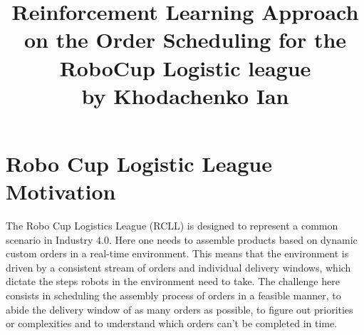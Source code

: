 \documentclass[runningheads,envcountsect]{llncs}
\title{{\huge Reinforcement Learning Approach on the Order Scheduling for the RoboCup Logistic league}\\{\LARGE \vspace{4pt} by Khodachenko Ian}}
\author{}
\institute{}
\begin{document}
\maketitle

\section{Robo Cup Logistic League Motivation}
The Robo Cup Logistics League (RCLL) is designed to represent a common scenario in Industry $4.0$. Here one needs to assemble products based on dynamic custom orders in a real-time environment. This means that the environment is driven by a consistent stream of orders and individual delivery windows, which dictate the steps robots in the environment need to take. The challenge here consists in scheduling the assembly process of orders in a feasible manner, to abide the delivery window of as many orders as possible, to figure out priorities or complexities and to understand which orders can't be completed in time.
\end{document}
